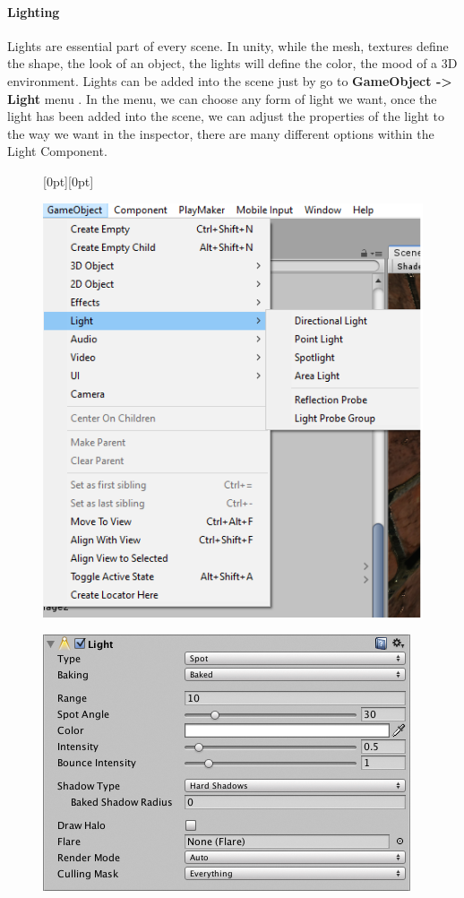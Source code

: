\documentclass[a4paper, 13pt]{extarticle}
\begin{document}
{\paragraph{Lighting}
Lights are essential part of every scene. In unity, while the mesh, textures define the shape, the look of an object, the lights will define the color, the mood of a 3D environment. Lights can be added into the scene just by go to {\bfseries GameObject -> Light} menu . In the menu, we can choose any form of light we want, once the light has been added into the scene, we can adjust the properties of the light to the way we want in the inspector, there are many different options within the Light Component. 
\newpage
\begin{figure}[h]
	\centering
	\raisebox{-25mm}[0pt][0pt]{
		\begin{minipage}{.4\textwidth}
			\centering
			\includegraphics[width=0.8\linewidth]{intructions/choose_light.png}
			\centering
			\label{fig:test26}
		\end{minipage}
		\begin{minipage}{.45\textwidth}
			\centering
			\includegraphics[width=1.2\linewidth]{intructions/light_properties.png}

\end{minipage}}
\end{figure}}
\end{document}
